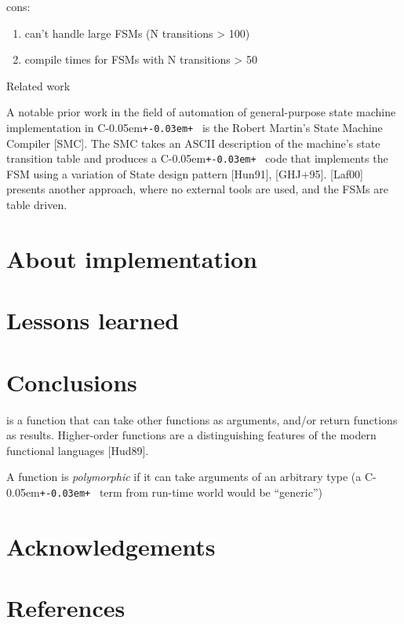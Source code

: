 \documentclass{kapproc}
\newcommand{\Cpp}{C\kern-0.05em\texttt{+\kern-0.03em+}%
}
\begin{document}
cons:
\begin{enumerate}
\item can't handle large FSMs (N transitions > 100) 
\item compile times for FSMs with N transitions > 50 
\end{enumerate}


Related work

A notable prior work in the field of automation of general-purpose 
state machine implementation in \Cpp\ is the Robert Martin's State 
Machine Compiler [SMC]. The SMC takes an ASCII description of the 
machine's state transition table and produces a \Cpp\ code that 
implements the FSM using a variation of State design pattern [Hun91],
[GHJ+95]. [Laf00] presents another approach, where no external tools 
are used, and the FSMs are table driven. 


\section{About implementation}

\section{Lessons learned}

\section{Conclusions}

\begin{glossary}
   is a function that can take other
  functions as arguments, and/or return functions as
  results. Higher-order functions are a distinguishing features of the
  modern functional languages [Hud89].

   A function is \emph{polymorphic} if it can take
  arguments of an arbitrary type (a \Cpp\ term from run-time world
  would be ``generic'')
\end{glossary}


\section{Acknowledgements}
\section{References}

 
\end{document}
